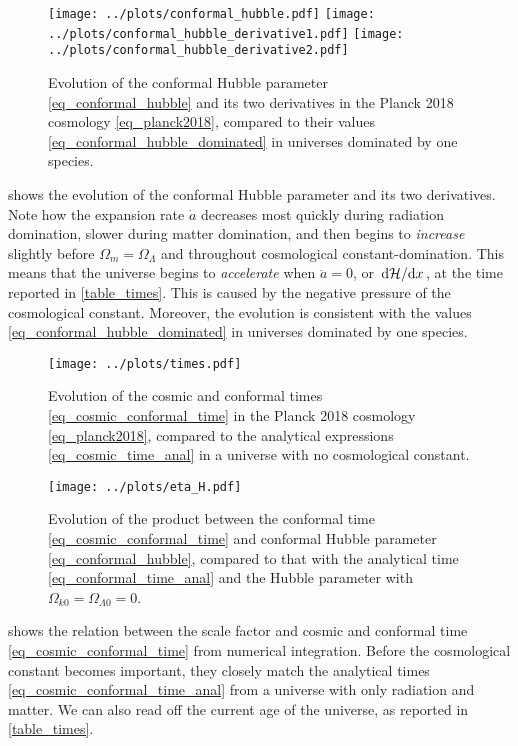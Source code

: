 \documentclass[10pt,a4paper]{article}
\begin{document}
\begin{figure}
	\centering
	\texttt{[image: ../plots/conformal\_hubble.pdf]}
	\texttt{[image: ../plots/conformal\_hubble\_derivative1.pdf]}
	\texttt{[image: ../plots/conformal\_hubble\_derivative2.pdf]}
	\caption{%
		Evolution of the conformal Hubble parameter \eqref{eq_conformal_hubble} and its two derivatives in the Planck 2018 cosmology \eqref{eq_planck2018},
		compared to their values \eqref{eq_conformal_hubble_dominated} in universes dominated by one species.}
	\label{fig_conformal_hubble}
\end{figure}

 shows the evolution of the conformal Hubble parameter and its two derivatives.
Note how the expansion rate $\dot{a}$ decreases most quickly during radiation domination,
slower during matter domination,
and then begins to \emph{increase} slightly before $\Omega_m = \Omega_\Lambda$ and throughout cosmological constant-domination.
This means that the universe begins to \emph{accelerate} when $\ddot{a}=0$, or $\odv{\mathcal{H}}/{x}$, at the time reported in \cref{table_times}.
This is caused by the negative pressure of the cosmological constant.
Moreover, the evolution is consistent with the values \eqref{eq_conformal_hubble_dominated} in universes dominated by one species.

\begin{figure}[t]
	\centering
	\texttt{[image: ../plots/times.pdf]}
	\caption{Evolution of the cosmic and conformal times \eqref{eq_cosmic_conformal_time} in the Planck 2018 cosmology \eqref{eq_planck2018}, compared to the analytical expressions \eqref{eq_cosmic_time_anal} in a universe with no cosmological constant.}
	\label{fig_cosmic_conformal_time}

	\texttt{[image: ../plots/eta\_H.pdf]}
	\caption{%
		Evolution of the product between the conformal time \eqref{eq_cosmic_conformal_time} and conformal Hubble parameter \eqref{eq_conformal_hubble},
		compared to that with the analytical time \eqref{eq_conformal_time_anal} and the Hubble parameter with $\Omega_{k0}=\Omega_{\Lambda0}=0$.
	}
	\label{fig_eta_H}
\end{figure}

 shows the relation between the scale factor and cosmic and conformal time \eqref{eq_cosmic_conformal_time} from numerical integration.
Before the cosmological constant becomes important, they closely match the analytical times \eqref{eq_cosmic_conformal_time_anal} from a universe with only radiation and matter.
We can also read off the current age of the universe, as reported in \cref{table_times}.
\end{document}
